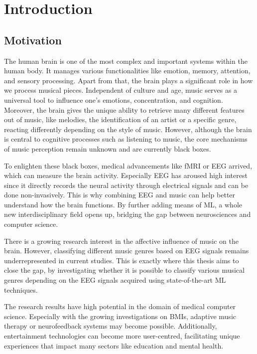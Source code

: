 
\chapter{Introduction}\label{chapter:introduction}
\acresetall
  \section{Motivation}
  The human brain is one of the most complex and important systems within the human body. It manages various functionalities like emotion, memory, attention, and sensory processing. Apart from that, the brain plays a significant role in how we process musical pieces. Independent of culture and age, music serves as a universal tool to influence one's emotions, concentration, and cognition. Moreover, the brain gives the unique ability to retrieve many different features out of music, like melodies, the identification of an artist or a specific genre, reacting differently depending on the style of music. However, although the brain is central to cognitive processes such as listening to music, the core mechanisms of music perception remain unknown and are currently black boxes.\par
  To enlighten these black boxes, medical advancements like \ac{fMRI} or \ac{EEG} arrived, which can measure the brain activity. Especially \ac{EEG} has aroused high interest since it directly records the neural activity through electrical signals and can be done non-invasively. This is why combining \ac{EEG} and music can help better understand how the brain functions. By further adding means of \ac{ML}, a whole new interdisciplinary field opens up, bridging the gap between neurosciences and computer science.\par
  There is a growing research interest in the affective influence of music on the brain. However, classifying different music genres based on \ac{EEG} signals remains underrepresented in current studies. This is exactly where this thesis aims to close the gap, by investigating whether it is possible to classify various musical genres depending on the EEG signals acquired using state-of-the-art ML techniques.\par
  The research results have high potential in the domain of medical computer science. Especially with the growing investigations on \acp{BMI}, adaptive music therapy or neurofeedback systems may become possible. Additionally, entertainment technologies can become more user-centred, facilitating unique experiences that impact many sectors like education and mental health.

